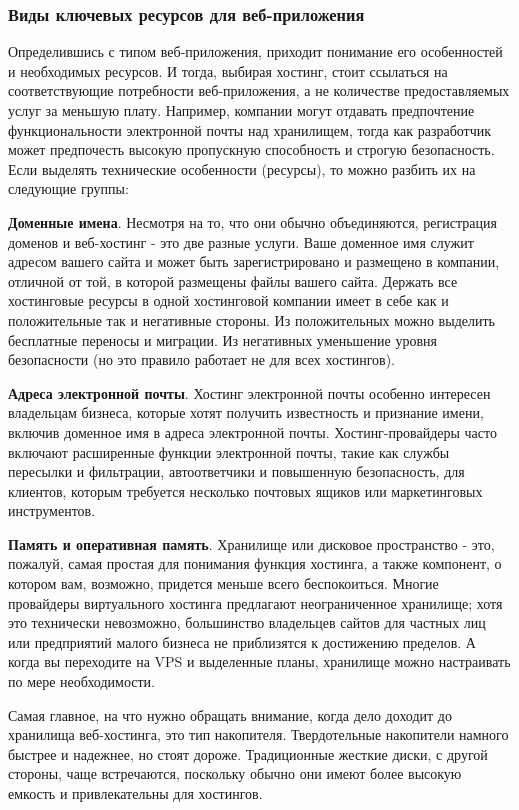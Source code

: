 \subsubsection{Виды ключевых ресурсов для веб-приложения}
\label{typeGeneralResorseOfWebApp} 

Определившись с типом веб-приложения, приходит понимание его особенностей и необходимых ресурсов. И тогда, выбирая хостинг, стоит ссылаться на соответствующие потребности веб-приложения, а не количестве предоставляемых услуг за меньшую плату. Например, компании могут отдавать предпочтение функциональности электронной почты над хранилищем, тогда как разработчик может предпочесть высокую пропускную способность и строгую безопасность. Если выделять технические особенности (ресурсы), то можно разбить их на следующие группы:

\textbf{Доменные имена}. Несмотря на то, что они обычно объединяются, регистрация доменов и веб-хостинг - это две разные услуги. Ваше доменное имя служит адресом вашего сайта и может быть зарегистрировано и размещено в компании, отличной от той, в которой размещены файлы вашего сайта. Держать все хостинговые ресурсы в одной хостинговой компании имеет в себе как и положительные так и негативные стороны. Из положительных можно выделить бесплатные переносы и миграции. Из негативных уменьшение уровня безопасности (но это правило работает не для всех хостингов).

\textbf{Адреса электронной почты}. Хостинг электронной почты особенно интересен владельцам бизнеса, которые хотят получить известность и признание имени, включив доменное имя в адреса электронной почты. Хостинг-провайдеры часто включают расширенные функции электронной почты, такие как службы пересылки и фильтрации, автоответчики и повышенную безопасность, для клиентов, которым требуется несколько почтовых ящиков или маркетинговых инструментов.

\textbf{Память и оперативная память}. Хранилище или дисковое пространство - это, пожалуй, самая простая для понимания функция хостинга, а также компонент, о котором вам, возможно, придется меньше всего беспокоиться. Многие провайдеры виртуального хостинга предлагают неограниченное хранилище; хотя это технически невозможно, большинство владельцев сайтов для частных лиц или предприятий малого бизнеса не приблизятся к достижению пределов. А когда вы переходите на VPS и выделенные планы, хранилище можно настраивать по мере необходимости.

Самая главное, на что нужно обращать внимание, когда дело доходит до хранилища веб-хостинга, это тип накопителя. Твердотельные накопители намного быстрее и надежнее, но стоят дороже. Традиционные жесткие диски, с другой стороны, чаще встречаются, поскольку обычно они имеют более высокую емкость и привлекательны для хостингов.

